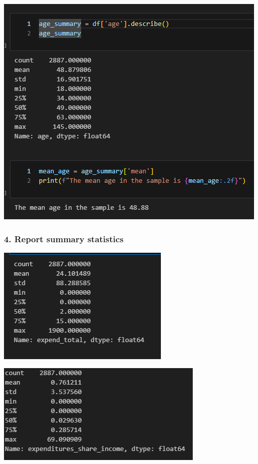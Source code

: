 \documentclass[
  12pt]{article}
\begin{document}
\includegraphics{images/9.png}

\subsubsection{4. Report summary
statistics}\label{report-summary-statistics}

\includegraphics{images/10-03.png}

\includegraphics{images/11-03.png}
\end{document}
